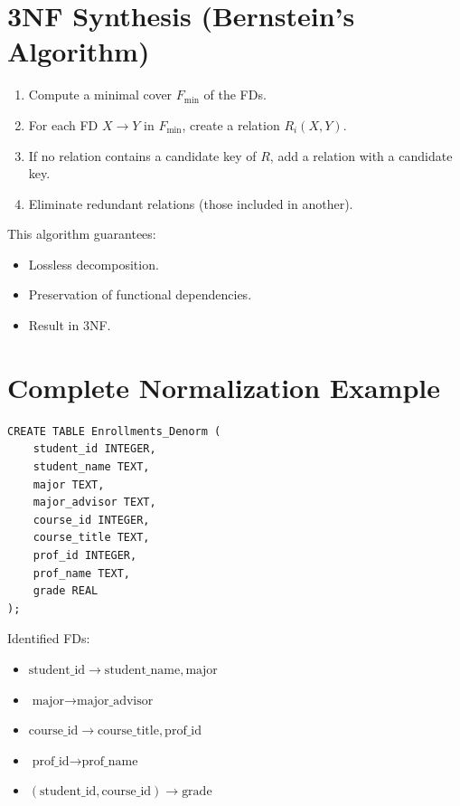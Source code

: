 \section{3NF Synthesis (Bernstein's Algorithm)}

\begin{proposition}
\begin{enumerate}
    \item Compute a minimal cover $F_{\min}$ of the FDs.
    \item For each FD $X \to Y$ in $F_{\min}$, create a relation $R_i(X, Y)$.
    \item If no relation contains a candidate key of $R$, add a relation
          with a candidate key.
    \item Eliminate redundant relations (those included in another).
\end{enumerate}
This algorithm guarantees:
\begin{itemize}
    \item Lossless decomposition.
    \item Preservation of functional dependencies.
    \item Result in 3NF.
\end{itemize}
\end{proposition}

\section{Complete Normalization Example}

\begin{codeblock}[title=\textbf{Unnormalized Table}]
\begin{verbatim}
CREATE TABLE Enrollments_Denorm (
    student_id INTEGER,
    student_name TEXT,
    major TEXT,
    major_advisor TEXT,
    course_id INTEGER,
    course_title TEXT,
    prof_id INTEGER,
    prof_name TEXT,
    grade REAL
);
\end{verbatim}
\end{codeblock}

Identified FDs:
\begin{itemize}
    \item $\text{student\_id} \to \text{student\_name}, \text{major}$
    \item $\text{major} \to \text{major\_advisor}$
    \item $\text{course\_id} \to \text{course\_title}, \text{prof\_id}$
    \item $\text{prof\_id} \to \text{prof\_name}$
    \item $(\text{student\_id}, \text{course\_id}) \to \text{grade}$
\end{itemize}

